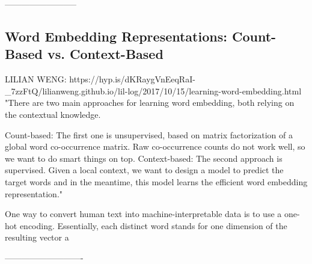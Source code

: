 --------------------------

\subsection{Word Embedding Representations: Count-Based vs. Context-Based}

LILIAN WENG: https://hyp.is/dKRaygVnEeqRaI-_7zzFtQ/lilianweng.github.io/lil-log/2017/10/15/learning-word-embedding.html
"There are two main approaches for learning word embedding, both relying on the contextual knowledge.

Count-based: The first one is unsupervised, based on matrix factorization of a global word co-occurrence matrix. Raw co-occurrence counts do not work well, so we want to do smart things on top.
Context-based: The second approach is supervised. Given a local context, we want to design a model to predict the target words and in the meantime, this model learns the efficient word embedding representation."


One way to convert human text into machine-interpretable data is to use a one-hot encoding. Essentially, each distinct word stands for one dimension of the resulting vector a

----------------------------

